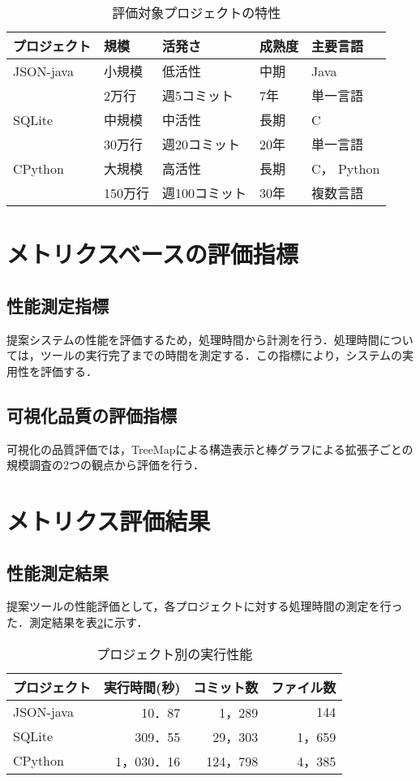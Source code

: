 \documentclass[12pt,twoside]{jbook}
\begin{document}
\begin{table}[htb]
\caption{評価対象プロジェクトの特性}
\label{tab:project-characteristics}
\begin{center}
\begin{tabular}{lllll}
\hline
プロジェクト & 規模 & 活発さ & 成熟度 & 主要言語 \\
\hline
JSON-java & 小規模 & 低活性 & 中期 & Java \\
 & 2万行 & 週5コミット & 7年 & 単一言語 \\
\hline
SQLite & 中規模 & 中活性 & 長期 & C \\
 & 30万行 & 週20コミット & 20年 & 単一言語 \\
\hline
CPython & 大規模 & 高活性 & 長期 & C， Python \\
 & 150万行 & 週100コミット & 30年 & 複数言語 \\
\hline

\end{tabular}
\end{center}
\end{table}

\section{メトリクスベースの評価指標}
\subsection{性能測定指標}
提案システムの性能を評価するため，処理時間から計測を行う．処理時間については，ツールの実行完了までの時間を測定する．この指標により，システムの実用性を評価する．
\subsection{可視化品質の評価指標}
可視化の品質評価では，TreeMapによる構造表示と棒グラフによる拡張子ごとの規模調査の2つの観点から評価を行う．
\section{メトリクス評価結果}
\subsection{性能測定結果}
提案ツールの性能評価として，各プロジェクトに対する処理時間の測定を行った．測定結果を表\ref{tab:performance-results}に示す．

\begin{table}[htb]
\caption{プロジェクト別の実行性能}
\label{tab:performance-results}
\begin{center}
\begin{tabular}{lrrr}
\hline
プロジェクト & 実行時間(秒) & コミット数 & ファイル数 \\
\hline
JSON-java & 10．87 & 1，289 & 144 \\
SQLite & 309．55 & 29，303 & 1，659 \\
CPython & 1，030．16 & 124，798 & 4，385 \\
\hline
\end{tabular}
\end{center}
\end{table}
\end{document}
